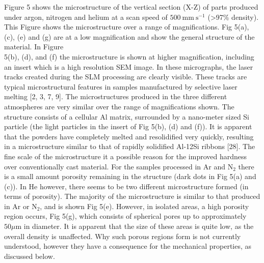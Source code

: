 \documentclass[10pt]{article}
\begin{document}
Figure 5 shows the microstructure of the vertical section (X-Z) of parts produced under argon, nitrogen and helium at a scan speed of $500 \mathrm{~mm} \mathrm{~s}^{-1}$ (>97\% density). This Figure shows the microstructure over a range of magnifications. Fig 5(a), (c), (e) and (g) are at a low magnification and show the general structure of the material. In Figure\\
5(b), (d), and (f) the microstructure is shown at higher magnification, including an insert which is a high resolution SEM image. In these micrographs, the laser tracks created during the SLM processing are clearly visible. These tracks are typical microstructural features in samples manufactured by selective laser melting [2, 3, 7, 9]. The microstructures produced in the three different atmospheres are very similar over the range of magnifications shown. The structure consists of a cellular Al matrix, surrounded by a nano-meter sized Si particle (the light particles in the insert of Fig 5(b), (d) and (f)). It is apparent that the powders have completely melted and resolidified very quickly, resulting in a microstructure similar to that of rapidly solidified Al-12Si ribbons [28]. The fine scale of the microstructure it a possible reason for the improved hardness over conventionally cast material. For the samples processed in Ar and $\mathrm{N}_{2}$ there is a small amount porosity remaining in the structure (dark dots in Fig 5(a) and (c)). In He however, there seems to be two different microstructure formed (in terms of porosity). The majority of the microstructure is similar to that produced in Ar or $\mathrm{N}_{2}$, and is shown Fig 5(e). However, in isolated areas, a high porosity region occurs, Fig 5(g), which consists of spherical pores up to approximately $50 \mu \mathrm{m}$ in diameter. It is apparent that the size of these areas is quite low, as the overall density is unaffected. Why such porous regions form is not currently understood, however they have a consequence for the mechanical properties, as discussed below.
\end{document}
